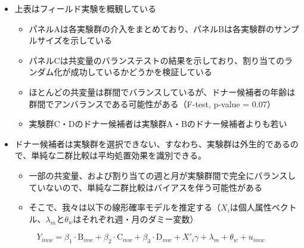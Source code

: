 \documentclass[
  a4paperpaper,
]{article}
\providecommand{\tightlist}{%
  \setlength{\itemsep}{0pt}\setlength{\parskip}{0pt}}\usepackage{longtable,booktabs,array}
\begin{document}
\begin{itemize}
\tightlist
\item
  上表はフィールド実験を概観している

  \begin{itemize}
  \tightlist
  \item
    パネルAは各実験群の介入をまとめており、パネルBは各実験群のサンプルサイズを示している
  \item
    パネルCは共変量のバランステストの結果を示しており、割り当てのランダム化が成功しているかどうかを検証している
  \item
    ほとんどの共変量は群間でバランスしているが、ドナー候補者の年齢は群間でアンバランスである可能性がある（F-test,
    p-value = \(0.07\)）
  \item
    実験群C・Dのドナー候補者は実験群A・Bのドナー候補者よりも若い
  \end{itemize}
\item
  ドナー候補者は実験群を選択できない、すなわち、実験群は外生的であるので、単純な二群比較は平均処置効果を識別できる。

  \begin{itemize}
  \tightlist
  \item
    一部の共変量、および割り当ての週と月が実験群間で完全にバランスしていないので、単純な二群比較はバイアスを伴う可能性がある
  \item
    そこで、我々は以下の線形確率モデルを推定する（\(X_i\)は個人属性ベクトル、\(\lambda_m\)と\(\theta_w\)はそれぞれ週・月のダミー変数）
  \end{itemize}
\end{itemize}

\begin{equation}
  Y_{imw} =
  \beta_1 \cdot \text{B}_{mw} + \beta_2 \cdot \text{C}_{mw}
  + \beta_3 \cdot \text{D}_{mw}
  + X'_i \gamma + \lambda_m + \theta_w + u_{imw}
\end{equation}
\end{document}
